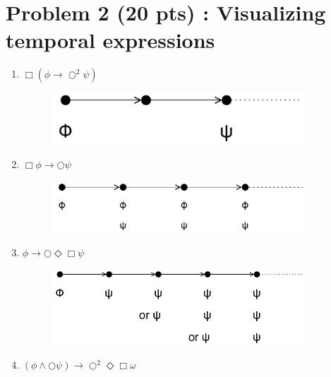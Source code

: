 \documentclass[12pt]{article}
\begin{document}
\newpage

\section*{Problem 2 (20 pts) :  Visualizing temporal expressions}

\begin{enumerate}

	\item $\Box (\phi \rightarrow \bigcirc^{2} \psi)$

  \begin{figure}[h!]
   \centering
   \includegraphics[width=0.9\textwidth]{figures/2_1.pdf}
  \end{figure}

	\item $\Box \phi \rightarrow \bigcirc \psi$

  \begin{figure}[h!]
   \centering
   \includegraphics[width=0.9\textwidth]{figures/2_2.pdf}
  \end{figure}

	\item $\phi \rightarrow \bigcirc \Diamond \Box \psi$

  \begin{figure}[h!]
    \centering
    \includegraphics[width=0.9\textwidth]{figures/2_3.pdf}
   \end{figure}

  \newpage

	\item $(\phi \wedge \bigcirc \psi) \rightarrow \bigcirc^{2} \Diamond \Box \omega$


\end{enumerate}
\end{document}
